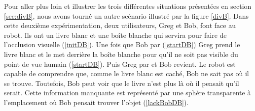 \documentclass[a4paper,11pt,twoside]{StyleThese}
\begin{document}
Pour aller plus loin et illustrer les trois différentes situations présentées en section \ref{sec:divB}, nous avons tourné un autre scénario illustré par la figure \ref{divB}. Dans cette deuxième expérimentation, deux utilisateurs, Greg et Bob, font face au robot. Ils ont un livre blanc et une boîte blanche qui servira pour faire de l'occlusion visuelle (\ref{initDB}).
Une fois que Bob par (\ref{startDB}) Greg prend le livre blanc et le met derrière la boîte blanche pour qu'il ne soit pas visible du point de vue humain (\ref{startDB}).
Puis Greg par et Bob revient. Le robot est capable de comprendre que, comme le livre blanc est caché, Bob ne sait pas où il se trouve. Toutefois, Bob peut voir que le livre n'est plus là où il pensait qu'il serait. Cette information manquante est représenté par une sphère transparente à l'emplacement où Bob pensait trouver l'objet (\ref{lackBobDB}).
\end{document}

